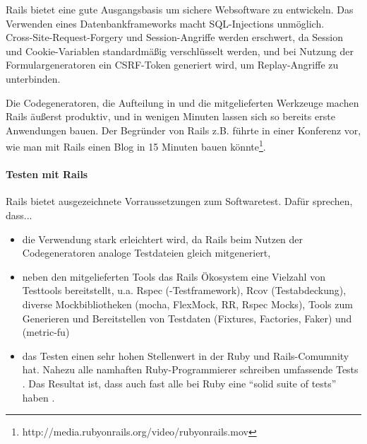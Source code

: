  Rails bietet eine gute Ausgangsbasis um sichere Websoftware zu entwickeln. Das Verwenden eines Datenbankframeworks macht SQL-Injections unmöglich. \\
Cross-Site-Request-Forgery und Session-Angriffe werden erschwert, da Session und Cookie-Variablen standardmäßig verschlüsselt werden, und bei Nutzung der Formulargeneratoren ein CSRF-Token generiert wird, um Replay-Angriffe zu unterbinden.

Die Codegeneratoren, die Aufteilung in  und die mitgelieferten Werkzeuge machen Rails äußerst produktiv, und in wenigen Minuten lassen sich so bereits erste Anwendungen bauen. Der Begründer von Rails z.B. führte in einer Konferenz vor, wie man mit Rails einen Blog in 15 Minuten bauen könnte\footnote{http://media.rubyonrails.org/video/rubyonrails.mov}.

\paragraph{Testen mit Rails}
Rails bietet ausgezeichnete Vorraussetzungen zum Softwaretest. Dafür sprechen, dass...

\begin{itemize}
 \item die Verwendung stark erleichtert wird, da Rails beim Nutzen der Codegeneratoren analoge Testdateien gleich mitgeneriert,
 \item neben den mitgelieferten Tools das Rails Ökosystem eine Vielzahl von Testtools bereitstellt, u.a. Rspec (-Testframework), Rcov (Testabdeckung), diverse Mockbibliotheken (mocha, FlexMock, RR, Rspec Mocks), Tools zum Generieren und Bereitstellen von Testdaten (Fixtures, Factories, Faker) und  (metric-fu)
 \item das Testen einen sehr hohen Stellenwert in der Ruby und Rails-Comumnity hat. Nahezu alle namhaften Ruby-Programmierer schreiben umfassende Tests \citep{devries_rails_2008}. Das Resultat ist, dass auch fast alle  bei Ruby eine "`solid suite of tests"' haben \citep{devries_rails_2008}.
\end{itemize}

